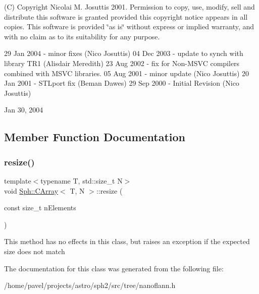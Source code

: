 (C) Copyright Nicolai M. Josuttis 2001. Permission to copy, use, modify, sell and distribute this software is granted provided this copyright notice appears in all copies. This software is provided \char`\"{}as is\char`\"{} without express or implied warranty, and with no claim as to its suitability for any purpose.

29 Jan 2004 -\/ minor fixes (Nico Josuttis) 04 Dec 2003 -\/ update to synch with library T\+R1 (Alisdair Meredith) 23 Aug 2002 -\/ fix for Non-\/\+M\+S\+VC compilers combined with M\+S\+VC libraries. 05 Aug 2001 -\/ minor update (Nico Josuttis) 20 Jan 2001 -\/ S\+T\+Lport fix (Beman Dawes) 29 Sep 2000 -\/ Initial Revision (Nico Josuttis)

Jan 30, 2004 

\subsection{Member Function Documentation}
\hypertarget{classSph_1_1CArray_a0f5c967e81e4aa9bd97acab77f88df72}{}\label{classSph_1_1CArray_a0f5c967e81e4aa9bd97acab77f88df72} 
\subsubsection{\texorpdfstring{resize()}{resize()}}
{\footnotesize\ttfamily template$<$typename T, std\+::size\+\_\+t N$>$ \\
void \hyperlink{classSph_1_1CArray}{Sph\+::\+C\+Array}$<$ T, N $>$\+::resize (\begin{DoxyParamCaption}\item[{const size\+\_\+t}]{n\+Elements }\end{DoxyParamCaption})\hspace{0.3cm}{\ttfamily [inline]}}

This method has no effects in this class, but raises an exception if the expected size does not match 

The documentation for this class was generated from the following file\+:\begin{DoxyCompactItemize}
\item 
/home/pavel/projects/astro/sph2/src/tree/nanoflann.\+h\end{DoxyCompactItemize}
